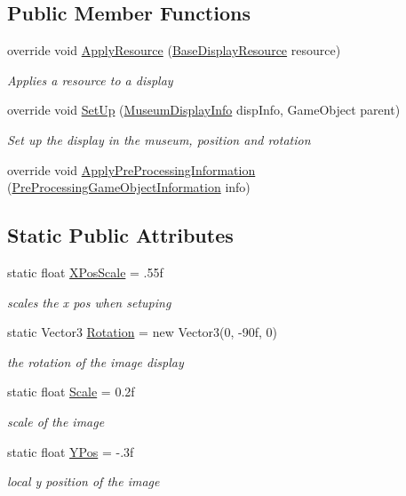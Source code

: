 \subsection*{Public Member Functions}
\begin{DoxyCompactItemize}
\item 
override void \mbox{\hyperlink{class_image_display_ab4cae8c66db7e7d77ab117fe24e63980}{Apply\+Resource}} (\mbox{\hyperlink{class_base_display_resource}{Base\+Display\+Resource}} resource)
\begin{DoxyCompactList}\small\item\em Applies a resource to a display \end{DoxyCompactList}\item 
override void \mbox{\hyperlink{class_image_display_a28fead7caeeb12490d26fae943da6a1e}{Set\+Up}} (\mbox{\hyperlink{class_museum_display_info}{Museum\+Display\+Info}} disp\+Info, Game\+Object parent)
\begin{DoxyCompactList}\small\item\em Set up the display in the museum, position and rotation \end{DoxyCompactList}\item 
override void \mbox{\hyperlink{class_image_display_a0ad82d85f6c4ec5eabb65afa1ae72bc1}{Apply\+Pre\+Processing\+Information}} (\mbox{\hyperlink{class_pre_processing_game_object_information}{Pre\+Processing\+Game\+Object\+Information}} info)
\end{DoxyCompactItemize}
\subsection*{Static Public Attributes}
\begin{DoxyCompactItemize}
\item 
static float \mbox{\hyperlink{class_image_display_ae1044419b2f9dfa64d75329e48e312de}{X\+Pos\+Scale}} = .\+55f
\begin{DoxyCompactList}\small\item\em scales the x pos when setuping \end{DoxyCompactList}\item 
static Vector3 \mbox{\hyperlink{class_image_display_a8ecd7f162065170c3f5cbcf906b11873}{Rotation}} = new Vector3(0, -\/90f, 0)
\begin{DoxyCompactList}\small\item\em the rotation of the image display \end{DoxyCompactList}\item 
static float \mbox{\hyperlink{class_image_display_aac7ba9a36c272ad5c6873119b521ed5e}{Scale}} = 0.\+2f
\begin{DoxyCompactList}\small\item\em scale of the image \end{DoxyCompactList}\item 
static float \mbox{\hyperlink{class_image_display_ac0ef458ef2e417549068a631e35f39d6}{Y\+Pos}} = -\/.\+3f
\begin{DoxyCompactList}\small\item\em local y position of the image \end{DoxyCompactList}\end{DoxyCompactItemize}
